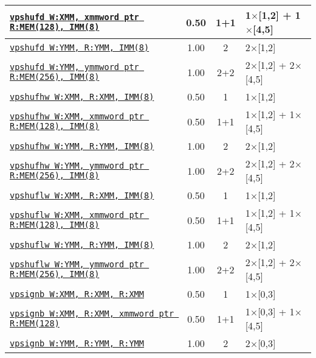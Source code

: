 \documentclass[a4paper,english,fontsize=9]{scrartcl}
\begin{document}
\begin{longtable}{p{}ccL{.25\textwidth}}
  \midrule
  \texttt{\href{https://felixcloutier.com/x86/PSHUFD.html}{vpshufd W:XMM, xmmword ptr R:MEM(128), IMM(8)}} & 0.50 & 1+1 & 1\(\times\)[1,2] + 1\(\times\)[4,5] \\
  \midrule
  \texttt{\href{https://felixcloutier.com/x86/PSHUFD.html}{vpshufd W:YMM, R:YMM, IMM(8)}} & 1.00 & 2 & 2\(\times\)[1,2] \\
  \midrule
  \texttt{\href{https://felixcloutier.com/x86/PSHUFD.html}{vpshufd W:YMM, ymmword ptr R:MEM(256), IMM(8)}} & 1.00 & 2+2 & 2\(\times\)[1,2] + 2\(\times\)[4,5] \\
  \midrule
  \texttt{\href{https://felixcloutier.com/x86/PSHUFHW.html}{vpshufhw W:XMM, R:XMM, IMM(8)}} & 0.50 & 1 & 1\(\times\)[1,2] \\
  \midrule
  \texttt{\href{https://felixcloutier.com/x86/PSHUFHW.html}{vpshufhw W:XMM, xmmword ptr R:MEM(128), IMM(8)}} & 0.50 & 1+1 & 1\(\times\)[1,2] + 1\(\times\)[4,5] \\
  \midrule
  \texttt{\href{https://felixcloutier.com/x86/PSHUFHW.html}{vpshufhw W:YMM, R:YMM, IMM(8)}} & 1.00 & 2 & 2\(\times\)[1,2] \\
  \midrule
  \texttt{\href{https://felixcloutier.com/x86/PSHUFHW.html}{vpshufhw W:YMM, ymmword ptr R:MEM(256), IMM(8)}} & 1.00 & 2+2 & 2\(\times\)[1,2] + 2\(\times\)[4,5] \\
  \midrule
  \texttt{\href{https://felixcloutier.com/x86/PSHUFLW.html}{vpshuflw W:XMM, R:XMM, IMM(8)}} & 0.50 & 1 & 1\(\times\)[1,2] \\
  \midrule
  \texttt{\href{https://felixcloutier.com/x86/PSHUFLW.html}{vpshuflw W:XMM, xmmword ptr R:MEM(128), IMM(8)}} & 0.50 & 1+1 & 1\(\times\)[1,2] + 1\(\times\)[4,5] \\
  \midrule
  \texttt{\href{https://felixcloutier.com/x86/PSHUFLW.html}{vpshuflw W:YMM, R:YMM, IMM(8)}} & 1.00 & 2 & 2\(\times\)[1,2] \\
  \midrule
  \texttt{\href{https://felixcloutier.com/x86/PSHUFLW.html}{vpshuflw W:YMM, ymmword ptr R:MEM(256), IMM(8)}} & 1.00 & 2+2 & 2\(\times\)[1,2] + 2\(\times\)[4,5] \\
  \midrule
  \texttt{\href{https://felixcloutier.com/x86/PSIGNB:PSIGNW:PSIGND.html}{vpsignb W:XMM, R:XMM, R:XMM}} & 0.50 & 1 & 1\(\times\)[0,3] \\
  \midrule
  \texttt{\href{https://felixcloutier.com/x86/PSIGNB:PSIGNW:PSIGND.html}{vpsignb W:XMM, R:XMM, xmmword ptr R:MEM(128)}} & 0.50 & 1+1 & 1\(\times\)[0,3] + 1\(\times\)[4,5] \\
  \midrule
  \texttt{\href{https://felixcloutier.com/x86/PSIGNB:PSIGNW:PSIGND.html}{vpsignb W:YMM, R:YMM, R:YMM}} & 1.00 & 2 & 2\(\times\)[0,3] \\

\end{longtable}
\end{document}
